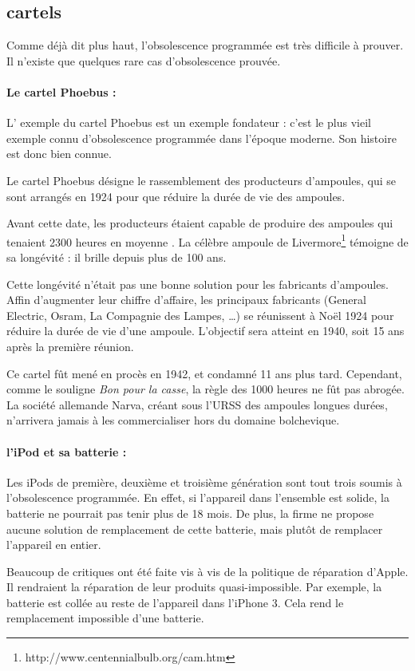 \subsection{cartels}



Comme déjà dit plus haut, l'obsolescence programmée est très difficile à prouver. Il n'existe que quelques rare cas d'obsolescence prouvée. 

\paragraph*{Le cartel Phoebus : } L' exemple du cartel Phoebus est un exemple fondateur : c'est le plus vieil exemple connu d'obsolescence programmée dans l'époque moderne. Son histoire est donc bien connue. 

Le cartel Phoebus désigne le rassemblement des producteurs d'ampoules, qui se sont arrangés en 1924 pour que réduire la durée de vie des ampoules. 

Avant cette date, les producteurs étaient capable de produire des ampoules qui tenaient 2300 heures en moyenne \cite{opes_PHOEBUS}. La célèbre ampoule de Livermore\footnote{http://www.centennialbulb.org/cam.htm} témoigne de sa longévité : il brille depuis plus de 100 ans. 

Cette longévité n'était pas une bonne solution pour les fabricants d'ampoules. Affin d'augmenter leur chiffre d'affaire,  les principaux fabricants (General Electric, Osram, La Compagnie des Lampes, \dots) se réunissent à Noël 1924 pour réduire la durée de vie d'une ampoule. L'objectif sera atteint  en 1940, soit 15 ans après la première réunion. 

Ce cartel fût mené en procès en 1942, et condamné 11 ans plus tard. Cependant, comme le souligne \textit{Bon pour la casse}, la règle des 1000 heures ne fût pas abrogée. La société allemande Narva, créant sous l'URSS des ampoules longues durées, n'arrivera jamais à les commercialiser hors du domaine bolchevique. 

\paragraph*{l'iPod et sa batterie : } Les iPods de première, deuxième et troisième génération sont tout trois soumis à l'obsolescence programmée. En effet, si l'appareil dans l'ensemble est solide, la batterie ne pourrait pas tenir plus de 18 mois. De plus, la firme ne propose aucune solution de remplacement de cette batterie, mais plutôt de remplacer l'appareil en entier. 

Beaucoup de critiques ont été faite vis à vis de la politique de réparation d'Apple. Il rendraient la réparation de leur produits quasi-impossible. Par exemple, la batterie est collée au reste de l'appareil dans l'iPhone 3. Cela rend le remplacement impossible d'une batterie. 

